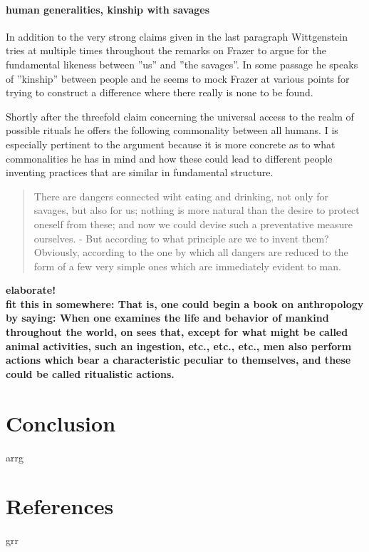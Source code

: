 \documentclass{article}
\begin{document}
\paragraph{human generalities, kinship with savages}
In addition to the very strong claims given in the last paragraph Wittgenstein tries at multiple times throughout the remarks on Frazer to argue for the fundamental likeness between ''us'' and ''the savages''. In some passage he speaks of ''kinship'' between people and he seems to mock Frazer at various points for trying to construct a difference where there really is none to be found. 

Shortly after the threefold claim concerning the universal access to the realm of possible rituals he offers the following commonality between all humans. I is especially pertinent to the argument because it is more concrete as to what commonalities he has in mind and how these could lead to different people inventing practices that are similar in fundamental structure.
\begin{quote}
There are dangers connected wiht eating and drinking, not only for savages, but also for us; nothing is more natural than the desire to protect oneself from these; and now we could devise such a preventative measure ourselves. - But according to what principle are we to invent them? Obviously, according to the one by which all dangers are reduced to the form of a few very simple ones which are immediately evident to man.
\end{quote}
\textbf{elaborate!\\ 
fit this in somewhere: That is, one could begin a book on anthropology by saying: When one examines the life and behavior of mankind throughout the world, on sees that, except for what might be called animal activities, such an ingestion, etc., etc., etc., men also perform actions which bear a characteristic peculiar to themselves, and these could be called ritualistic actions.}


\section{Conclusion}
\hypertarget{sec4}{arrg}
\section{References}
\hypertarget{sec5}{grr}
\end{document}
